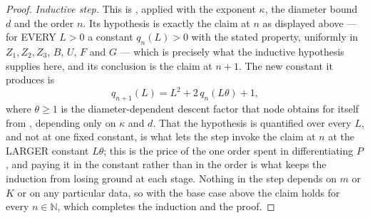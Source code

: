 \begin{proof}
\medskip\noindent\emph{Inductive step.}
This is , applied with the exponent $\kappa$, the diameter
bound $d$ and the order $n$.  Its hypothesis is exactly the claim at $n$ as displayed above ---
for EVERY $L>0$ a constant $q_n(L)>0$ with the stated property, uniformly in $Z_1,Z_2,Z_3$,
$B$, $U$, $F$ and $G$ --- which is precisely what the inductive hypothesis supplies here, and
its conclusion is the claim at $n+1$.  The new constant it produces is
\[
  q_{n+1}(L)=L^{2}+2\,q_n(L\theta)+1,
\]
where $\theta\ge1$ is the diameter-dependent descent factor that node obtains for itself from
, depending only on $\kappa$ and $d$.  That the hypothesis is
quantified over every $L$, and not at one fixed constant, is what lets the step invoke the
claim at $n$ at the LARGER constant $L\theta$; this is the price of the one order spent in
differentiating $P$, and paying it in the constant rather than in the order is what keeps the
induction from losing ground at each stage.  Nothing in the step depends on $m$ or $K$ or on
any particular data, so with the base case above the claim holds for every $n\in\mathbb{N}$,
which completes the induction and the proof.
\end{proof}
